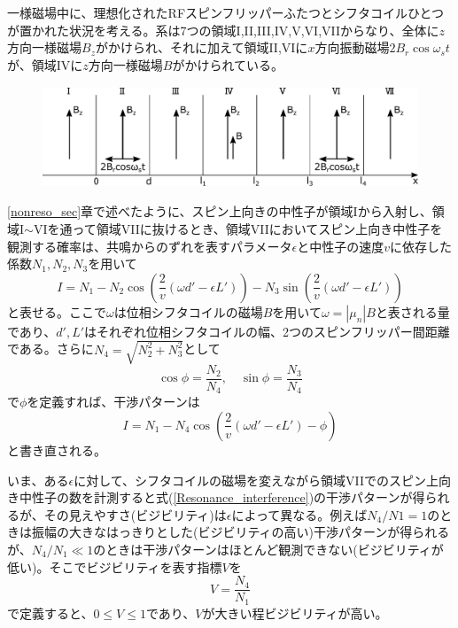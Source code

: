 一様磁場中に、理想化されたRFスピンフリッパーふたつとシフタコイルひとつが置かれた状況を考える。系は7つの領域I,II,III,IV,V,VI,VIIからなり、全体に$z$方向一様磁場$B_z$がかけられ、それに加えて領域II,VIに$x$方向振動磁場$2B_r\cos\omega_s t$が、領域IVに$z$方向一様磁場$B$がかけられている。
\begin{figure}[h]
\centering
\includegraphics[height=3cm]{resonance/whatwhyhow/Resonance_why_setting.pdf}
\end{figure}

\ref{nonreso_sec}章で述べたように、スピン上向きの中性子が領域Iから入射し、領域I$\sim$VIを通って領域VIIに抜けるとき、領域VIIにおいてスピン上向き中性子を観測する確率は、共鳴からのずれを表すパラメータ$\epsilon$と中性子の速度$v$に依存した係数$N_1,N_2,N_3$を用いて
\begin{equation}
I=N_1-N_2\cos\left(\frac{2}{v}(\omega d'-\epsilon L')\right) -N_3\sin\left(\frac{2}{v}(\omega d'-\epsilon L')\right) \label{analysis_theory_ippan}
\end{equation}
と表せる。ここで$\omega$は位相シフタコイルの磁場$B$を用いて$\omega=|\mu_n|B$と表される量であり、$d',L'$はそれぞれ位相シフタコイルの幅、2つのスピンフリッパー間距離である。さらに$N_4=\sqrt{N_2^2+N_3^2}$として
\begin{equation}
\cos \phi=\frac{N_2}{N_4}, \quad \sin \phi=\frac{N_3}{N_4}
\end{equation}
で$\phi$を定義すれば、干渉パターンは
\begin{equation}
I=N_1-N_4\cos\left(\frac{2}{v}(\omega d'-\epsilon L')-\phi\right)\label{Resonance_interference}
\end{equation}
と書き直される。

いま、ある$\epsilon$に対して、シフタコイルの磁場を変えながら領域VIIでのスピン上向き中性子の数を計測すると式(\ref{Resonance_interference})の干渉パターンが得られるが、その見えやすさ(ビジビリティ)は$\epsilon$によって異なる。例えば$N_4/N1=1$のときは振幅の大きなはっきりとした(ビジビリティの高い)干渉パターンが得られるが、$N_4/N_1 \ll 1$のときは干渉パターンはほとんど観測できない(ビジビリティが低い)。そこでビジビリティを表す指標$V$を
\begin{equation}
V=\frac{N_4}{N_1}
\end{equation}
で定義すると、$0 \le V \le 1$であり、$V$が大きい程ビジビリティが高い。

